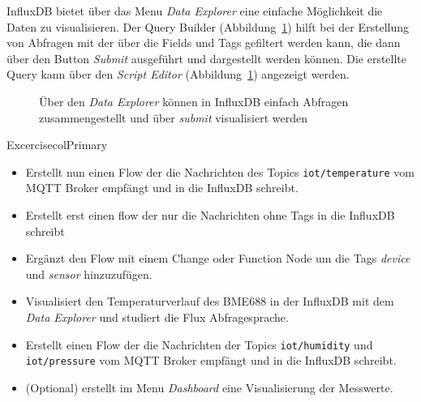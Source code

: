 \documentclass[
  11pt,
  a4paper,
  oneside, openany  ,captions=tableheading
]{scrbook}
\providecommand{\tightlist}{%
  \setlength{\itemsep}{0pt}\setlength{\parskip}{0pt}}
\theoremstyle{remark}
\begin{document}
InfluxDB bietet über das Menu \emph{Data Explorer} eine einfache
Möglichkeit die Daten zu visualisieren. Der Query Builder
(Abbildung~\ref{fig-influxdbdataexplorer}) hilft bei der Erstellung von
Abfragen mit der über die Fields und Tags gefiltert werden kann, die
dann über den Button \emph{Submit} ausgeführt und dargestellt werden
können. Die erstellte Query kann über den \emph{Script Editor}
(Abbildung~\ref{fig-influxdbdataexplorer}) angezeigt werden.

\begin{figure}


\caption{\label{fig-influxdbdataexplorer}Über den \emph{Data Explorer}
können in InfluxDB einfach Abfragen zusammengestellt und über
\emph{submit} visualisiert werden}

\end{figure}%

\begin{boxtitle}{Excercise}{colPrimary}

\begin{itemize}
\tightlist
\item
  Erstellt nun einen Flow der die Nachrichten des Topics
  \texttt{iot/temperature} vom MQTT Broker empfängt und in die InfluxDB
  schreibt.
\item
  Erstellt erst einen flow der nur die Nachrichten ohne Tags in die
  InfluxDB schreibt
\item
  Ergänzt den Flow mit einem Change oder Function Node um die Tags
  \emph{device} und \emph{sensor} hinzuzufügen.
\item
  Visualisiert den Temperaturverlauf des BME688 in der InfluxDB mit dem
  \emph{Data Explorer} und studiert die Flux Abfragesprache.
\item
  Erstellt einen Flow der die Nachrichten der Topics
  \texttt{iot/humidity} und \texttt{iot/pressure} vom MQTT Broker
  empfängt und in die InfluxDB schreibt.
\item
  (Optional) erstellt im Menu \emph{Dashboard} eine Visualisierung der
  Messwerte.
\end{itemize}

\end{boxtitle}
\end{document}
